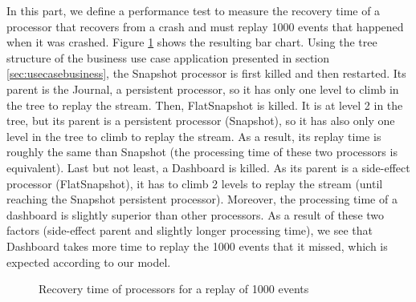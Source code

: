 In this part, we define a performance test to measure the recovery time of a processor that recovers from a crash and must replay 1000 events that happened when it was crashed. Figure \ref{fig:barchart} shows the resulting bar chart.
Using the tree structure of the business use case application presented in section \ref{sec:usecasebusiness}, the Snapshot processor is first killed and then restarted. Its parent is the Journal, a persistent processor, so it has only one level to climb in the tree to replay the stream. Then, FlatSnapshot is killed. It is at level 2 in the tree, but its parent is a persistent processor (Snapshot), so it has also only one level in the tree to climb to replay the stream. As a result, its replay time is roughly the same than Snapshot (the processing time of these two processors is equivalent). Last but not least, a Dashboard is killed. As its parent is a side-effect processor (FlatSnapshot), it has to climb 2 levels to replay the stream (until reaching the Snapshot persistent processor). Moreover, the processing time of a dashboard is slightly superior than other processors. As a result of these two factors (side-effect parent and slightly longer processing time), we see that Dashboard takes more time to replay the 1000 events that it missed, which is expected according to our model.
\\
\begin{figure}[h]
  \begin{center} 
    \caption{Recovery time of processors for a replay of 1000 events}
    \label{fig:barchart}
  \end{center}
\end{figure}


